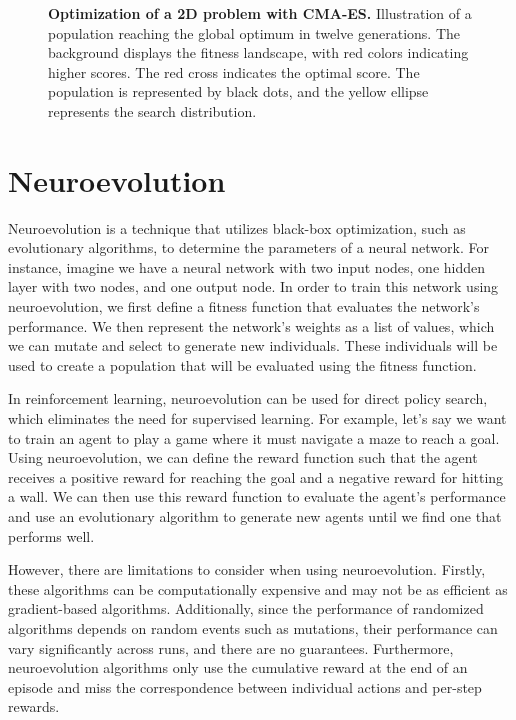 \begin{figure}[!ht]
\centering
{}
\caption[Optimization of a 2D problem with CMA-ES]{
  \textbf{Optimization of a 2D problem with CMA-ES.}
  Illustration of a population reaching the global optimum in twelve generations. The background displays the fitness landscape, with red colors indicating higher scores. The red cross indicates the optimal score. The population is represented by black dots, and the yellow ellipse represents the search distribution.
 }
\label{fig:cma_es}
\end{figure}

\section{Neuroevolution}

Neuroevolution is a technique that utilizes black-box optimization, such as evolutionary algorithms, to determine the parameters of a neural network. For instance, imagine we have a neural network with two input nodes, one hidden layer with two nodes, and one output node. In order to train this network using neuroevolution, we first define a fitness function that evaluates the network's performance. We then represent the network's weights as a list of values, which we can mutate and select to generate new individuals. These individuals will be used to create a population that will be evaluated using the fitness function.

In reinforcement learning, neuroevolution can be used for direct policy search, which eliminates the need for supervised learning. For example, let's say we want to train an agent to play a game where it must navigate a maze to reach a goal. Using neuroevolution, we can define the reward function such that the agent receives a positive reward for reaching the goal and a negative reward for hitting a wall. We can then use this reward function to evaluate the agent's performance and use an evolutionary algorithm to generate new agents until we find one that performs well.

However, there are limitations to consider when using neuroevolution. Firstly, these algorithms can be computationally expensive and may not be as efficient as gradient-based algorithms. Additionally, since the performance of randomized algorithms depends on random events such as mutations, their performance can vary significantly across runs, and there are no guarantees. Furthermore, neuroevolution algorithms only use the cumulative reward at the end of an episode and miss the correspondence between individual actions and per-step rewards.

